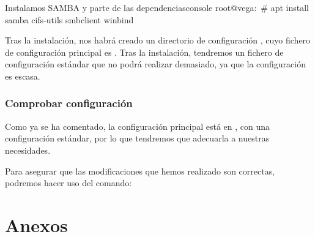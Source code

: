 \documentclass{../../../yukibook.cls/yukibook}
\begin{document}
\begin{mycode}{Instalamos SAMBA y parte de las dependencias}{console}{}
root@vega:~# apt install samba cifs-utils smbclient winbind
\end{mycode}

Tras la instalación, nos habrá creado un directorio de configuración   , cuyo fichero de configuración principal es  . Tras la instalación, tendremos un fichero de configuración estándar que no podrá realizar demasiado, ya que la configuración es escasa.

\section{Comprobar configuración}
Como ya se ha comentado, la configuración principal está en    , con una configuración estándar, por lo que tendremos que adecuarla a nuestras necesidades.

Para asegurar que las modificaciones que hemos realizado son correctas, podremos hacer uso del comando:



\part{Anexos}

\graphicspath{{../../../anexos/instalar_ubuntu_lts/}}


\graphicspath{{../../../anexos/ubuntu_raid1/}}


\graphicspath{{../../../anexos/monitorizacion_munin/}}


\graphicspath{{../../../anexos/}}

\end{document}

